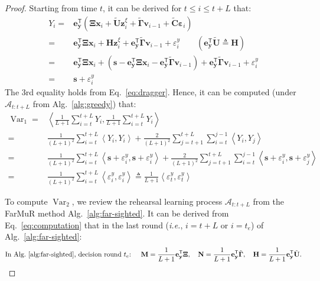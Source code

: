\documentclass{article}
\theoremstyle{plain}
\theoremstyle{definition}
\theoremstyle{remark}
\def \ie {\textit{i.e.}}
\def \Eq {Eq.}
\def \x {\mathbf{x}}
\def \sA {\mathcal{A}}
\def \N {\mathbf{N}}
\def \s {\mathbf{s}}
\def \U {\mathbf{U}}
\def \M {\mathbf{M}}
\def \H {\mathbf{H}}
\def \C {\mathbf{C}}
\def \e {\mathbf{e}}
\def \v {\mathbf{v}}
\def \y {\mathbf{y}}
\def \z {\mathbf{z}}
\begin{document}
\begin{proof}
Starting from time \(t\), it can be derived for \(t\leq i \leq t+L\) that:
\[
\begin{aligned}
  Y_i  =& \e_\y^\mathsf{T}\left(\bm{\Xi}\x_i + \tilde{\U} \z_i^\xi +  \tilde{\bm{\Gamma}}\v_{i-1} + \tilde{\C} \bm{\varepsilon}_i\right)\\
  =& \e_\y^\mathsf{T} \bm{\Xi}\x_i + \H \z_i^\xi + \e_\y^\mathsf{T} \tilde{\bm{\Gamma}}\v_{i-1} + \varepsilon^y_i \qquad (\e_\y^\mathsf{T}\tilde{\U} \triangleq\H)\\
  =& \e_\y^\mathsf{T} \bm{\Xi}\x_i + \left(\s - \e_\y^\mathsf{T} \bm{\Xi}\x_i-\e_\y^\mathsf{T} \tilde{\bm{\Gamma}}\v_{i-1} \right) + \e_\y^\mathsf{T} \tilde{\bm{\Gamma}}\v_{i-1} + \varepsilon^y_i \\
  =& \s + \varepsilon^y_i
\end{aligned}
\]
The 3rd equality holds from \Eq~\eqref{eq:dragger}. Hence, it can be computed (under \(\sA_{t:t+L}\) from Alg.~\ref{alg:greedy}) that: 
\begin{equation}
  \label{eq:var1}
  \begin{aligned}
    \operatorname{Var}_1 =& \left\langle \frac{1}{L+1} \sum\limits_{i=t}^{t+L} Y_i, \frac{1}{L+1}  \sum\limits_{i=t}^{t+L} Y_i \right\rangle  \\
    =& \frac{1}{(L+1)^2}\sum\limits_{i=t}^{t+L} \left\langle Y_i, Y_i \right\rangle  + \frac{2}{(L+1)^2}\sum\limits_{j=t+1}^{t+L}\sum\limits_{i=t}^{j-1} \left\langle Y_i, Y_j \right\rangle\\
    =& \frac{1}{(L+1)^2}\sum\limits_{i=t}^{t+L} \left\langle \s + \varepsilon^y_i, \s + \varepsilon^y_i \right\rangle  + \frac{2}{(L+1)^2}\sum\limits_{j=t+1}^{t+L}\sum\limits_{i=t}^{j-1} \left\langle \s + \varepsilon^y_i, \s + \varepsilon^y_j \right\rangle\\
    =& \frac{1}{(L+1)^2}\sum\limits_{i=t}^{t+L} \left\langle  \varepsilon^y_i, \varepsilon^y_i \right\rangle \triangleq \frac{1}{L+1}  \left\langle \varepsilon^y_t, \varepsilon^y_t\right\rangle
  \end{aligned}
\end{equation}

To compute \(\operatorname{Var}_2\), we review the rehearsal learning process \(\sA_{t:t+L}\) from the FarMuR method Alg.~\ref{alg:far-sighted}. 
It can be derived from \Eq~\eqref{eq:computation} that in the last round (\ie, \(i=t+L\) or \(i=t_e\)) of Alg.~\ref{alg:far-sighted}:
\[
\text{In Alg.~\ref{alg:far-sighted}, decision round \(t_e\): }\quad \M = \frac{1}{L+1}\e_\y^\mathsf{T} \bm{\Xi}, \quad \N = \frac{1}{L+1}\e_\y^\mathsf{T} \tilde{\bm{\Gamma}}, \quad \H = \frac{1}{L+1}\e_\y^\mathsf{T} \tilde{\bm{\U}}. 
\]



\end{proof}
\end{document}
